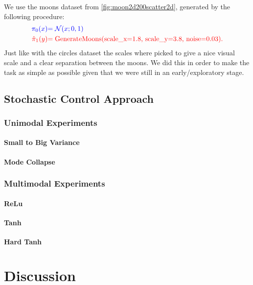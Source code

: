 \documentclass[a4paper,12pt,twoside,openright]{report}
\theoremstyle{definition}
\begin{document}
We use the moons dataset from \ref{fig:moon2d200scatter2d}, generated by the following procedure:
\begin{align*}
     \color{blue}{\pi_0(x)} &\color{blue}{= {\mathcal{N}}(x; 0,  1)} \\
    \color{red}{\hat{\pi}_1(y)} &\color{red}{= \text{GenerateMoons(scale\_x=1.8, scale\_y=3.8, noise=0.03)}}.
\end{align*}
Just like with the circles dataset the scales where picked to give a nice visual scale and a clear separation between the moons. We did this in order to make the task as simple as possible given that we were still in an early/exploratory stage.


\section{Stochastic Control Approach}
\subsection{Unimodal Experiments}
\subsubsection{Small to Big Variance}
\subsubsection{Mode Collapse}
\subsection{Multimodal Experiments}
\subsubsection{ReLu}
\subsubsection{Tanh}
\subsubsection{Hard Tanh}
\chapter{Discussion}


\appendix
\singlespacing

 
 
\end{document}
